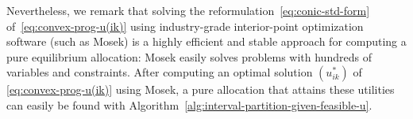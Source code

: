 Nevertheless, we remark that solving the reformulation~\eqref{eq:conic-std-form} of~\eqref{eq:convex-prog-u(ik)} using industry-grade interior-point optimization software (such as Mosek) is a highly efficient and stable approach for computing a pure equilibrium allocation: Mosek easily solves problems with hundreds of variables and constraints.
After computing an optimal solution $(u^*_{ik})$ of \eqref{eq:convex-prog-u(ik)} using Mosek, a pure allocation that attains these utilities can easily be found with Algorithm~\ref{alg:interval-partition-given-feasible-u}. %

